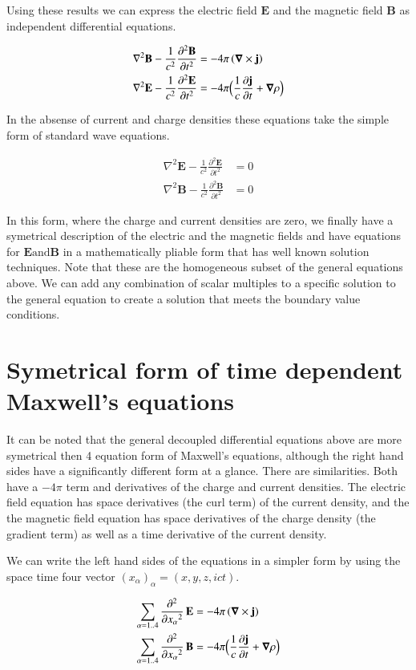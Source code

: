 \documentclass{article}      %
\newcommand{\grad}[0]{\boldsymbol{\nabla}}
\newcommand{\curl}[0]{\grad \times}
\newcommand{\delsquared}[0]{\nabla^2}
\newcommand{\delambert}[1]{\sum_{\alpha = 1 .. 4}{\Dsq{x_\alpha}{#1}}}
\newcommand{\D}[2] {\frac {\partial #2} {\partial #1}}
\newcommand{\Dsq}[2] {\frac {\partial^2 #2} {\partial {#1}^2}}
\newcommand{\Bj}[0]{\mathbf{j}}
\newcommand{\BB}[0]{\mathbf{B}}
\newcommand{\BE}[0]{\mathbf{E}}
\begin{document}
Using these results we can express the 
electric field $\BE$ and the
magnetic field $\BB$
as independent differential equations.

\begin{align*}
\delsquared \BB - \frac{1}{c^2} \Dsq{t}{\BB} &= - 4\pi \left(\curl \Bj\right) \\
\delsquared \BE - \frac{1}{c^2} \Dsq{t}{\BE} &= - 4\pi \Bigl(\frac{1}{c} \D{t}{\Bj} + \grad \rho\Bigr)
\end{align*}

In the absense of current and charge densities these equations take the simple form of standard wave
equations.

\begin{align*}
\delsquared \BE - \frac{1}{c^2} \Dsq{t}{\BE} &= 0 \\
\delsquared \BB - \frac{1}{c^2} \Dsq{t}{\BB} &= 0
\end{align*}

In this form, where the charge and current densities are zero, we finally have 
a symetrical description of the electric and the magnetic fields and have equations 
for $\BE \text{and} \BB$ in a mathematically pliable form that has well known 
solution techniques.
Note that these are the homogeneous subset of the general equations above.
We can add any combination of scalar multiples to a specific solution 
to the general equation to create a solution that meets the boundary 
value conditions.

\section{Symetrical form of time dependent Maxwell's equations}

It can 
be noted that the general decoupled differential equations above are more 
symetrical then 4 equation form of Maxwell's equations, although the
right hand sides have a significantly different form at a glance.  There
are similarities.  Both have a $-4\pi$ term and derivatives of the charge and
current densities.  The electric field equation has space derivatives (the curl term) of 
the current density, and the the magnetic field equation has space derivatives of 
the charge density (the gradient term) as well as a time derivative of the current
density.

We can write the left hand sides of the equations in a simpler form by using the 
space time four vector $(x_\alpha)_\alpha = (x, y, z, ict)$.

\begin{align*}
\delambert{} \,\BE &= - 4\pi \left(\curl \Bj\right) \\
\delambert{} \,\BB &= - 4\pi \Bigl(\frac{1}{c} \D{t}{\Bj} + \grad \rho\Bigr)
\end{align*}
\end{document}
